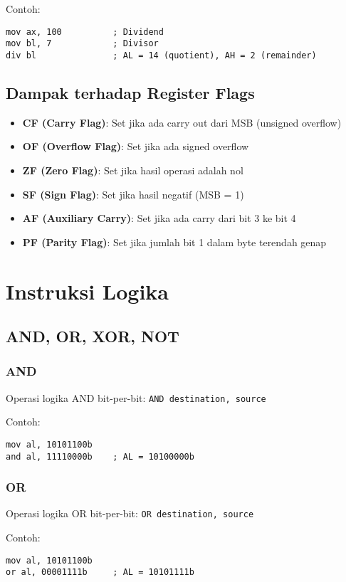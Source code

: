 Contoh:
\begin{verbatim}
mov ax, 100          ; Dividend
mov bl, 7            ; Divisor
div bl               ; AL = 14 (quotient), AH = 2 (remainder)
\end{verbatim}

\subsection{Dampak terhadap Register Flags}
\begin{itemize}
    \item \textbf{CF (Carry Flag)}: Set jika ada carry out dari MSB (unsigned overflow)
    \item \textbf{OF (Overflow Flag)}: Set jika ada signed overflow
    \item \textbf{ZF (Zero Flag)}: Set jika hasil operasi adalah nol
    \item \textbf{SF (Sign Flag)}: Set jika hasil negatif (MSB = 1)
    \item \textbf{AF (Auxiliary Carry)}: Set jika ada carry dari bit 3 ke bit 4
    \item \textbf{PF (Parity Flag)}: Set jika jumlah bit 1 dalam byte terendah genap
\end{itemize}

\section{Instruksi Logika}\label{sec:instruksi-dasar-logika}
\subsection{AND, OR, XOR, NOT}
\subsubsection{AND}
Operasi logika AND bit-per-bit: \texttt{AND destination, source}

Contoh:
\begin{verbatim}
mov al, 10101100b
and al, 11110000b    ; AL = 10100000b
\end{verbatim}

\subsubsection{OR}
Operasi logika OR bit-per-bit: \texttt{OR destination, source}

Contoh:
\begin{verbatim}
mov al, 10101100b
or al, 00001111b     ; AL = 10101111b
\end{verbatim}

